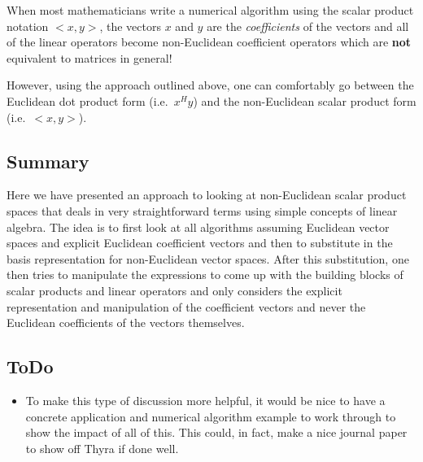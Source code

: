 \begin{dumb_fact}
When most mathematicians write a numerical algorithm using the scalar product
notation $<x,y>$, the vectors $x$ and $y$ are the {}\textit{coefficients} of
the vectors and all of the linear operators become non-Euclidean coefficient
operators which are {}\textbf{not} equivalent to matrices in general!
\end{dumb_fact}

However, using the approach outlined above, one can comfortably go between the
Euclidean dot product form (i.e.\ $x^H y$) and the non-Euclidean scalar
product form (i.e.\ $<x,y>$).

\subsection{Summary}

Here we have presented an approach to looking at non-Euclidean scalar product
spaces that deals in very straightforward terms using simple concepts of
linear algebra.  The idea is to first look at all algorithms assuming
Euclidean vector spaces and explicit Euclidean coefficient vectors and then to
substitute in the basis representation for non-Euclidean vector spaces.  After
this substitution, one then tries to manipulate the expressions to come up
with the building blocks of scalar products and linear operators and only
considers the explicit representation and manipulation of the coefficient
vectors and never the Euclidean coefficients of the vectors themselves.

\subsection{ToDo}

\begin{itemize}

{}\item To make this type of discussion more helpful, it would be nice to have
a concrete application and numerical algorithm example to work through to show
the impact of all of this.  This could, in fact, make a nice journal paper to
show off Thyra if done well.

\end{itemize}
